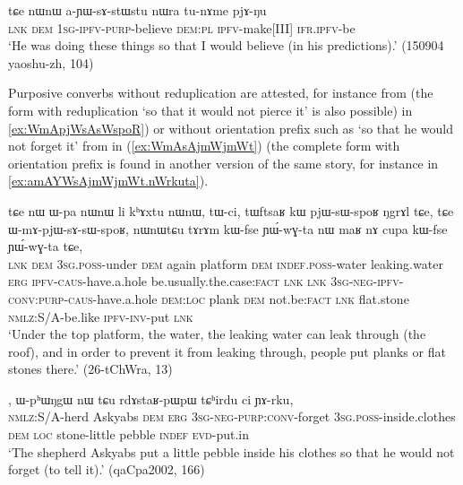 \begin{exe}
\ex \label{ex:aYWsAstWstu}
\gll  tɕe nɯnɯ a-ɲɯ-sɤ-stɯ\redp{}stu nɯra tu-nɤme pjɤ-ŋu \\
\textsc{lnk} \textsc{dem} \textsc{1sg}-\textsc{ipfv}-\textsc{purp}-believe \textsc{dem}:\textsc{pl} \textsc{ipfv}-make[III] \textsc{ifr}.\textsc{ipfv}-be \\
\glt `He was doing these things so that I would believe (in his predictions).' (150904 yaoshu-zh, 104)
\end{exe}

Purposive converbs without reduplication are attested, for instance  from  (the form with reduplication  `so that it would not pierce it' is also possible) in \ref{ex:WmApjWsAsWspoR}) or without orientation prefix such as  `so that he would not forget it' from  in (\ref{ex:WmAsAjmWjmWt}) (the complete form with orientation prefix is found in another version of the same story, for instance in \ref{ex:amAYWsAjmWjmWt.nWrkuta}).


\begin{exe}
\ex \label{ex:WmApjWsAsWspoR}
\gll  tɕe nɯ ɯ-pa nɯnɯ li kʰɤxtu nɯnɯ, tɯ-ci, tɯftsaʁ kɯ pjɯ-sɯ-spoʁ ŋgrɤl tɕe, tɕe ɯ-mɤ-pjɯ-sɤ-sɯ-spoʁ, nɯnɯtɕu tɤrɤm kɯ-fse ɲɯ́-wɣ-ta nɯ maʁ nɤ cupa kɯ-fse ɲɯ́-wɣ-ta tɕe, \\
\textsc{lnk} \textsc{dem} \textsc{3sg.poss}-under \textsc{dem} again platform \textsc{dem} \textsc{indef.poss}-water leaking.water \textsc{erg} \textsc{ipfv}-\textsc{caus}-have.a.hole be.usually.the.case:\textsc{fact} \textsc{lnk} \textsc{lnk} \textsc{3sg-neg-ipfv-conv:purp}-\textsc{caus}-have.a.hole \textsc{dem}:\textsc{loc} plank \textsc{dem} not.be:\textsc{fact} \textsc{lnk} flat.stone \textsc{nmlz}:S/A-be.like \textsc{ipfv-inv}-put \textsc{lnk} \\
\glt `Under the top platform, the water, the leaking water can leak through (the roof), and in order to prevent it from leaking through, people put planks or flat stones there.' (26-tChWra, 13)
\end{exe}

\begin{exe}
\ex \label{ex:WmAsAjmWjmWt}
, ɯ-pʰɯŋgɯ nɯ tɕu rdɤstaʁ-pɯpɯ tɕʰirdu ci ɲɤ-rku, \\
 \textsc{nmlz}:S/A-herd Askyabs \textsc{dem} \textsc{erg}  \textsc{3sg-neg-purp:conv}-forget \textsc{3sg.poss}-inside.clothes \textsc{dem} \textsc{loc} stone-little pebble \textsc{indef}
 \textsc{evd}-put.in\\
\glt `The shepherd Askyabs put a little pebble inside his clothes so that he would not forget (to tell it).' (qaCpa2002, 166)
\end{exe}

